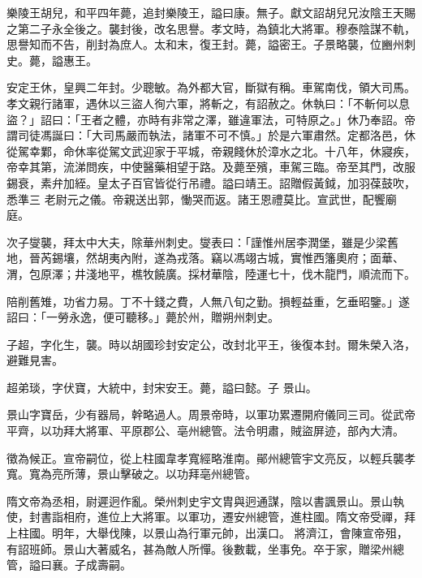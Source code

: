 \begin{pinyinscope}
 樂陵王胡兒，和平四年薨，追封樂陵王，謚曰康。無子。獻文詔胡兒兄汝陰王天賜之第二子永全後之。襲封後，改名思譽。孝文時，為鎮北大將軍。穆泰陰謀不軌，思譽知而不告，削封為庶人。太和末，復王封。薨，謚密王。子景略襲，位豳州刺史。薨，謚惠王。



 安定王休，皇興二年封。少聰敏。為外都大官，斷獄有稱。車駕南伐，領大司馬。孝文親行諸軍，遇休以三盜人徇六軍，將斬之，有詔赦之。休執曰：「不斬何以息盜？」詔曰：「王者之體，亦時有非常之澤，雖違軍法，可特原之。」休乃奉詔。帝謂司徒馮誕曰：「大司馬嚴而執法，諸軍不可不慎。」於是六軍肅然。定都洛邑，休從駕幸鄴，命休率從駕文武迎家于平城，帝親餞休於漳水之北。十八年，休寢疾，帝幸其第，流涕問疾，中使醫藥相望于路。及薨至殯，車駕三臨。帝至其門，改服錫衰，素弁加絰。皇太子百官皆從行吊禮。謚曰靖王。詔贈假黃鉞，加羽葆鼓吹，悉準三
 老尉元之儀。帝親送出郭，慟哭而返。諸王恩禮莫比。宣武世，配饗廟庭。



 次子燮襲，拜太中大夫，除華州刺史。燮表曰：「謹惟州居李潤堡，雖是少梁舊地，晉芮錫壤，然胡夷內附，遂為戎落。竊以馮翊古城，實惟西籓奧府；面華、渭，包原澤；井淺地平，樵牧饒廣。採材華陰，陸運七十，伐木龍門，順流而下。



 陪削舊雉，功省力易。丁不十錢之費，人無八旬之勤。損輕益重，乞垂昭鑒。」遂詔曰：「一勞永逸，便可聽移。」薨於州，贈朔州刺史。



 子超，字化生，襲。時以胡國珍封安定公，改封北平王，後復本封。爾朱榮入洛，避難見害。



 超弟琰，字伏寶，大統中，封宋安王。薨，謚曰懿。子
 景山。



 景山字寶岳，少有器局，幹略過人。周景帝時，以軍功累遷開府儀同三司。從武帝平齊，以功拜大將軍、平原郡公、亳州總管。法令明肅，賊盜屏迹，部內大清。



 徵為候正。宣帝嗣位，從上柱國韋孝寬經略淮南。鄖州總管宇文亮反，以輕兵襲孝寬。寬為亮所薄，景山擊破之。以功拜亳州總管。



 隋文帝為丞相，尉遲迥作亂。榮州刺史宇文胄與迥通謀，陰以書諷景山。景山執使，封書詣相府，進位上大將軍。以軍功，遷安州總管，進柱國。隋文帝受禪，拜上柱國。明年，大舉伐陳，以景山為行軍元帥，出漢口。
 將濟江，會陳宣帝殂，有詔班師。景山大著威名，甚為敵人所憚。後數載，坐事免。卒于家，贈梁州總管，謚曰襄。子成壽嗣。




\end{pinyinscope}
